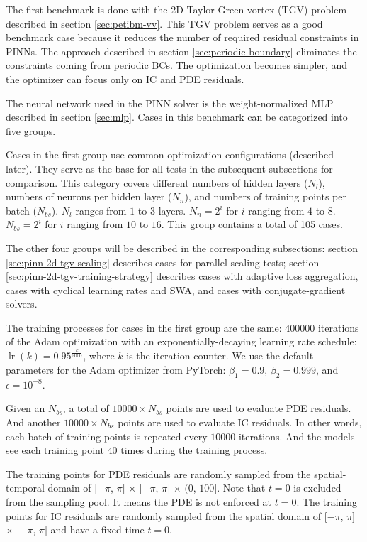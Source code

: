 
The first benchmark is done with the 2D Taylor-Green vortex (TGV) problem described in section \ref{sec:petibm-vv}.
This TGV problem serves as a good benchmark case because it reduces the number of required residual constraints in PINNs.
The approach described in section \ref{sec:periodic-boundary} eliminates the constraints coming from periodic BCs.
The optimization becomes simpler, and the optimizer can focus only on IC and PDE residuals.

The neural network used in the PINN solver is the weight-normalized MLP described in section \ref{sec:mlp}.
Cases in this benchmark can be categorized into five groups.

Cases in the first group use common optimization configurations (described later).
They serve as the base for all tests in the subsequent subsections for comparison.
This category covers different numbers of hidden layers ($N_l$), numbers of neurons per hidden layer ($N_n$), and numbers of training points per batch ($N_{bs}$).
$N_l$ ranges from $1$ to $3$ layers.
$N_n=2^i$ for $i$ ranging from $4$ to $8$.
$N_{bs}=2^i$ for $i$ ranging from $10$ to $16$.
This group contains a total of 105 cases.

The other four groups will be described in the corresponding subsections: section \ref{sec:pinn-2d-tgv-scaling} describes cases for parallel scaling tests; section \ref{sec:pinn-2d-tgv-training-strategy} describes cases with adaptive loss aggregation, cases with cyclical learning rates and SWA, and cases with conjugate-gradient solvers.

The training processes for cases in the first group are the same: \num{400000} iterations of the Adam optimization with an exponentially-decaying learning rate schedule: $\operatorname{lr}(k) = 0.95^\frac{k}{5000}$, where $k$ is the iteration counter.
We use the default parameters for the Adam optimizer from PyTorch: $\beta_1=0.9$, $\beta_2=0.999$, and $\epsilon=10^{-8}$.

Given an $N_{bs}$, a total of $\num{10000} \times N_{bs}$ points are used to evaluate PDE residuals.
And another $\num{10000} \times N_{bs}$ points are used to evaluate IC residuals.
In other words, each batch of training points is repeated every $\num{10000}$ iterations.
And the models see each training point $40$ times during the training process.

The training points for PDE residuals are randomly sampled from the spatial-temporal domain of $[-\pi$, $\pi]$ $\times$ $[-\pi$, $\pi]$ $\times$ $(0$, $100]$.
Note that $t=0$ is excluded from the sampling pool.
It means the PDE is not enforced at $t=0$.
The training points for IC residuals are randomly sampled from the spatial domain of $[-\pi$, $\pi]$ $\times$ $[-\pi$, $\pi]$ and have a fixed time $t=0$.

